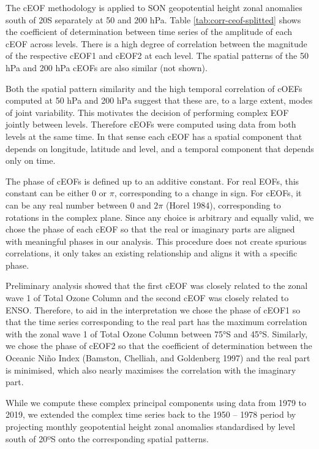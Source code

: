 \documentclass[smallextended]{svjour3}       %
\begin{document}
The cEOF methodology is applied to SON geopotential height zonal anomalies south of 20\degree S separately at 50 and 200 hPa.
Table \ref{tab:corr-ceof-splitted} shows the coefficient of determination between time series of the amplitude of each cEOF across levels.
There is a high degree of correlation between the magnitude of the respective cEOF1 and cEOF2 at each level.
The spatial patterns of the 50 hPa and 200 hPa cEOFs are also similar (not shown).

Both the spatial pattern similarity and the high temporal correlation of cOEFs computed at 50 hPa and 200 hPa suggest that these are, to a large extent, modes of joint variability.
This motivates the decision of performing complex EOF jointly between levels.
Therefore cEOFs were computed using data from both levels at the same time.
In that sense each cEOF has a spatial component that depends on longitude, latitude and level, and a temporal component that depends only on time.

The phase of cEOFs is defined up to an additive constant.
For real EOFs, this constant can be either 0 or \(\pi\), corresponding to a change in sign.
For cEOFs, it can be any real number between 0 and \(2\pi\) (Horel 1984), corresponding to rotations in the complex plane.
Since any choice is arbitrary and equally valid, we chose the phase of each cEOF so that the real or imaginary parts are aligned with meaningful phases in our analysis.
This procedure does not create spurious correlations, it only takes an existing relationship and aligns it with a specific phase.

Preliminary analysis showed that the first cEOF was closely related to the zonal wave 1 of Total Ozone Column and the second cEOF was closely related to ENSO.
Therefore, to aid in the interpretation we chose the phase of cEOF1 so that the time series corresponding to the real part has the maximum correlation with the zonal wave 1 of Total Ozone Column between 75°S and 45°S.
Similarly, we chose the phase of cEOF2 so that the coefficient of determination between the Oceanic Niño Index (Bamston, Chelliah, and Goldenberg 1997) and the real part is minimised, which also nearly maximises the correlation with the imaginary part.

While we compute these complex principal components using data from 1979 to 2019, we extended the complex time series back to the 1950 -- 1978 period by projecting monthly geopotential height zonal anomalies standardised by level south of 20ºS onto the corresponding spatial patterns.
\end{document}
